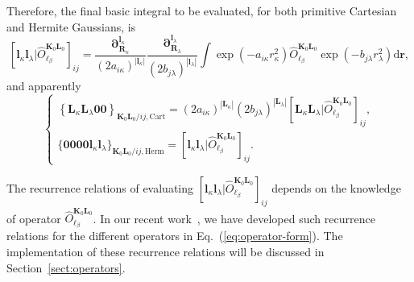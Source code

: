 \documentclass[a4paper,11pt,twoside,openright]{book}
\begin{document}
Therefore, the final basic integral to be evaluated, for both primitive Cartesian and Hermite Gaussians, is~\cite{bgkrth-a,bgkr}
\begin{equation}
  \label{eq:basic-int}
  \left[\boldsymbol{l}_{\kappa}\boldsymbol{l}_{\lambda}\Big|%
    \hat{O}_{\ell_{\beta}}^{\boldsymbol{K}_{0}\boldsymbol{L}_{0}}\right]_{ij}
  =\frac{\boldsymbol{\partial}_{\boldsymbol{R}_{\kappa}}^{\boldsymbol{l}_{\kappa}}}%
      {(2a_{i\kappa})^{|\boldsymbol{l}_{\kappa}|}}%
    \frac{\boldsymbol{\partial}_{\boldsymbol{R}_{\lambda}}^{\boldsymbol{l}_{\lambda}}}%
      {(2b_{j\lambda})^{|\boldsymbol{l}_{\lambda}|}}%
    \int\exp(-a_{i\kappa}r_{\kappa}^2)\hat{O}_{\ell_{\beta}}^{\boldsymbol{K}_{0}\boldsymbol{L}_{0}}%
      \exp(-b_{j\lambda}r_{\lambda}^2)\mathrm{d}\boldsymbol{r},
\end{equation}
and apparently
\begin{equation}
  \label{eq:basic-cgto-hgto-int}
  \begin{cases}
    \left\{\boldsymbol{L}_{\kappa}\boldsymbol{L}_{\lambda}\boldsymbol{00}\right\}_{\boldsymbol{K}_{0}\boldsymbol{L}_{0}/ij,\text{Cart}}
    =(2a_{i\kappa})^{|\boldsymbol{L}_{\kappa}|}(2b_{j\lambda})^{|\boldsymbol{L}_{\lambda}|}%
      \left[\boldsymbol{L}_{\kappa}\boldsymbol{L}_{\lambda}\Big|%
        \hat{O}_{\ell_{\beta}}^{\boldsymbol{K}_{0}\boldsymbol{L}_{0}}\right]_{ij},\\
    \{\boldsymbol{0000}\boldsymbol{l}_{\kappa}\boldsymbol{l}_{\lambda}\}_{\boldsymbol{K}_{0}\boldsymbol{L}_{0}/ij,\text{Herm}}
    =\left[\boldsymbol{l}_{\kappa}\boldsymbol{l}_{\lambda}\Big|%
      \hat{O}_{\ell_{\beta}}^{\boldsymbol{K}_{0}\boldsymbol{L}_{0}}\right]_{ij}.
  \end{cases}
\end{equation}

The recurrence relations of evaluating $\left[\boldsymbol{l}_{\kappa}\boldsymbol{l}_{\lambda}\Big|%
\hat{O}_{\ell_{\beta}}^{\boldsymbol{K}_{0}\boldsymbol{L}_{0}}\right]_{ij}$ depends on the
knowledge of operator $\hat{O}_{\ell_{\beta}}^{\boldsymbol{K}_{0}\boldsymbol{L}_{0}}$.
In our recent work~\cite{Gao:IJQC:2010,bgkrth-a,bgkr}, we have developed such recurrence
relations for the different operators in Eq.~(\ref{eq:operator-form}). The implementation of these
recurrence relations will be discussed in Section~\ref{sect:operators}.
\end{document}
